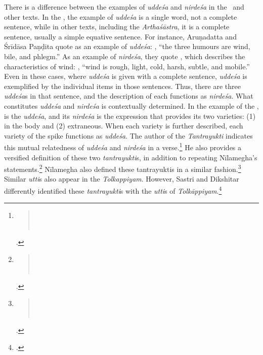 There is a difference between the examples of 
\emph{uddeśa} and \emph{nirdeśa} in the \SS\ and other texts. 
In the \SS, the example of \emph{uddeśa} is a single word, 
not a complete sentence, while in other texts, including the \emph{Arthaśāstra}, 
it is a complete sentence, usually a simple equative sentence. 
For instance, Aruṇadatta and Śrīdāsa Paṇḍita quote  as an 
example of \emph{uddeśa}: 
, 
“the three humours are wind, bile, and phlegm.” 
As an example of \emph{nirdeśa}, they quote , 
which describes the characteristics of wind: 
,
“wind is rough, light, cold, harsh, subtle, and mobile.”
Even in these cases, where \emph{uddeśa} is given with a complete sentence, 
\emph{uddeśa} is exemplified by the individual items in those sentences. 
Thus, there are three \emph{uddeśa}s in that sentence, 
and the description of each functions as \emph{nirdeśa}. 
What constitutes \emph{uddeśa} and \emph{nirdeśa} is contextually 
determined. 
In the example of the \SS,  is the \emph{uddeśa}, 
and its \emph{nirdeśa} is the expression that provides its two varieties: 
(1) in the body and (2) extraneous. 
When each variety is further described, each variety of the spike functions as 
\emph{uddeśa}. 
The author of the \emph{Tantrayukti} indicates 
this mutual relatedness of \emph{uddeśa} and \emph{nirdeśa} in a 
verse.\footnote{
	\begin{verse}
		\\
		\\
	\end{verse}
	\cite[12]{nara-1949}.} 
He also provides a versified definition of these two \emph{tantrayukti}s, 
in addition to repeating Nīlamegha's statements.\footnote{
	\begin{verse}
		\\
		\\
	\end{verse}
	\cite[12]{nara-1949}.} 
Nīlamegha also defined these tantrayuktis in a similar fashion.\footnote{
	\begin{verse}
		\\
		\\
	\end{verse}
	\cite[6]{muth-1976}.}  
Similar \emph{utti}s also appear in the \emph{Tolkappiyam}. 
However, Sastri and Dikshitar differently identified these \emph{tantrayukti}s 
with the \emph{utti}s of \emph{Tolkāppiyam}.\footcite[85]{chev-2009}

